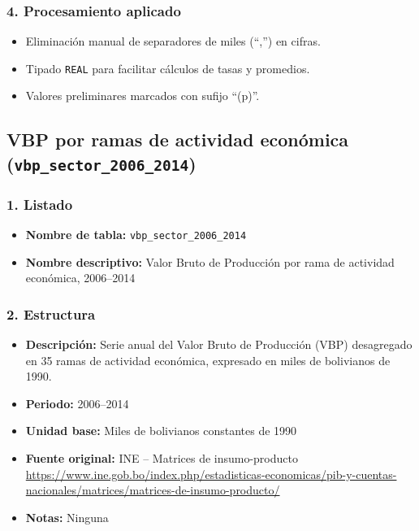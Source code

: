 \documentclass[12pt,a4paper]{article}
\begin{document}
\subsubsection*{4. Procesamiento aplicado}
\begin{itemize}
  \item Eliminación manual de separadores de miles (“,”) en cifras.
  \item Tipado \texttt{REAL} para facilitar cálculos de tasas y promedios.
  \item Valores preliminares marcados con sufijo “(p)”.
\end{itemize}
\subsection{VBP por ramas de actividad económica (\texttt{vbp\_sector\_2006\_2014})}

\subsubsection*{1. Listado}
\begin{itemize}
  \item \textbf{Nombre de tabla:} \texttt{vbp\_sector\_2006\_2014}
  \item \textbf{Nombre descriptivo:} Valor Bruto de Producción por rama de actividad económica, 2006--2014
\end{itemize}

\subsubsection*{2. Estructura}
\begin{itemize}
  \item \textbf{Descripción:} Serie anual del Valor Bruto de Producción (VBP) desagregado en 35 ramas de actividad económica, expresado en miles de bolivianos de 1990.
  \item \textbf{Periodo:} 2006--2014
  \item \textbf{Unidad base:} Miles de bolivianos constantes de 1990
  \item \textbf{Fuente original:} INE – Matrices de insumo-producto\\
    \url{https://www.ine.gob.bo/index.php/estadisticas-economicas/pib-y-cuentas-nacionales/matrices/matrices-de-insumo-producto/}
  \item \textbf{Notas:} Ninguna
\end{itemize}
\end{document}
